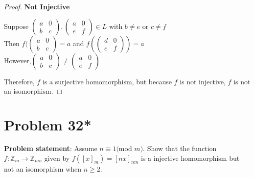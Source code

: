 \documentclass{article} %
\begin{document}
\begin{addmargin}[1em]{0em}
\begin{proof}
\textbf{Not Injective}
\begin{addmargin}[1em]{0em}
Suppose $ \left( \begin{smallmatrix} a & 0 \\ b & c \end{smallmatrix} \right),  \left( \begin{smallmatrix} a & 0 \\ e & f \end{smallmatrix} \right) \in L$ with $b \neq e$ or $c \neq f$
\\Then $f(\left( \begin{smallmatrix} a & 0 \\ b & c \end{smallmatrix} \right) = a$ and $f( \left( \begin{smallmatrix} d & 0 \\ e & f \end{smallmatrix} \right)) = a$
\\However,$\left( \begin{smallmatrix} a & 0 \\ b & c \end{smallmatrix} \right) \neq  \left( \begin{smallmatrix} a & 0 \\ e & f \end{smallmatrix} \right)$
\end{addmargin}
Therefore, $f$ is a surjective homomorphism, but because $f$ is not injective, $f$ is not an isomorphism.
\end{proof}
\end{addmargin}

\newpage

\section*{Problem 32*}

\textbf{Problem statement}: Assume $n \equiv 1 ($mod $m)$.  Show that the function $f:\mathbb{Z}_m \rightarrow \mathbb{Z}_{mn}$ given by $f([x]_m) = [nx]_{nm}$ is a injective homomorphism but not an isomorphism when $n \geq 2$.
\\ 
\end{document}
